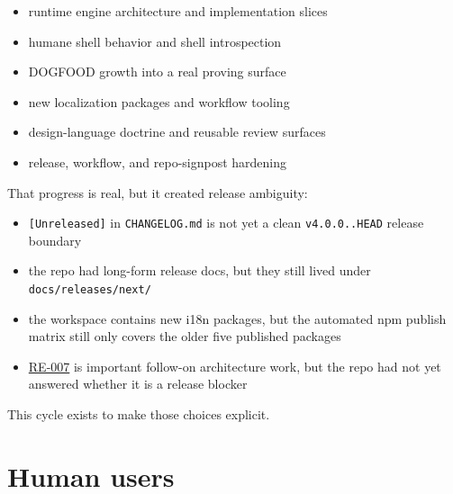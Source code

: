 \begin{itemize}
\tightlist
\item
  runtime engine architecture and implementation slices
\item
  humane shell behavior and shell introspection
\item
  DOGFOOD growth into a real proving surface
\item
  new localization packages and workflow tooling
\item
  design-language doctrine and reusable review surfaces
\item
  release, workflow, and repo-signpost hardening
\end{itemize}

That progress is real, but it created release ambiguity:

\begin{itemize}
\tightlist
\item
  \texttt{[\allowbreak{}U\allowbreak{}n\allowbreak{}r\allowbreak{}e\allowbreak{}l\allowbreak{}e\allowbreak{}a\allowbreak{}s\allowbreak{}e\allowbreak{}d\allowbreak{}]} in \texttt{C\allowbreak{}H\allowbreak{}A\allowbreak{}N\allowbreak{}G\allowbreak{}E\allowbreak{}L\allowbreak{}O\allowbreak{}G\allowbreak{}.\allowbreak{}m\allowbreak{}d} is not yet a clean \texttt{v\allowbreak{}4\allowbreak{}.\allowbreak{}0\allowbreak{}.\allowbreak{}0\allowbreak{}.\allowbreak{}.\allowbreak{}H\allowbreak{}E\allowbreak{}A\allowbreak{}D} release boundary
\item
  the repo had long-form release docs, but they still lived under \texttt{d\allowbreak{}o\allowbreak{}c\allowbreak{}s\allowbreak{}/\allowbreak{}r\allowbreak{}e\allowbreak{}l\allowbreak{}e\allowbreak{}a\allowbreak{}s\allowbreak{}e\allowbreak{}s\allowbreak{}/\allowbreak{}n\allowbreak{}e\allowbreak{}x\allowbreak{}t\allowbreak{}/}
\item
  the workspace contains new i18n packages, but the automated npm publish matrix still only covers the older five published packages
\item
  \href{https://github.com/flyingrobots/bijou/blob/cbd70612140e7a450d764b3c7be1c6af878b99bc/docs/method/graveyard/legacy-backlog/up-next/RE-007-migrate-framed-shell-onto-runtime-engine-seams.md}{RE-007} is important follow-on architecture work, but the repo had not yet answered whether it is a release blocker
\end{itemize}

This cycle exists to make those choices explicit.

\section{Human users}\label{record-202-human-users}

